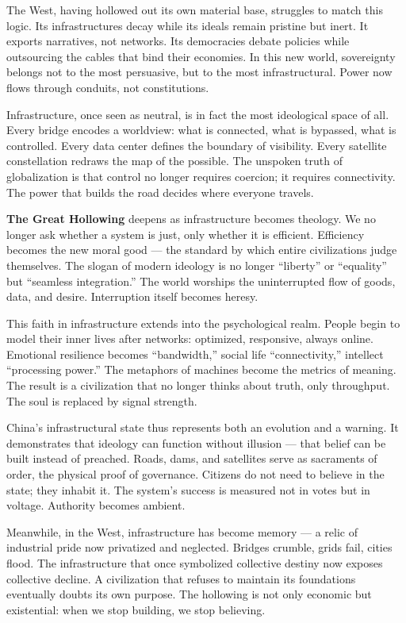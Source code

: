 \documentclass[11pt,twoside]{book}
\begin{document}
The West, having hollowed out its own material base, struggles to match this logic.  Its infrastructures decay while its ideals remain pristine but inert.  It exports narratives, not networks.  Its democracies debate policies while outsourcing the cables that bind their economies.  In this new world, sovereignty belongs not to the most persuasive, but to the most infrastructural.  Power now flows through conduits, not constitutions.

Infrastructure, once seen as neutral, is in fact the most ideological space of all.  Every bridge encodes a worldview: what is connected, what is bypassed, what is controlled.  Every data center defines the boundary of visibility.  Every satellite constellation redraws the map of the possible.  The unspoken truth of globalization is that control no longer requires coercion; it requires connectivity.  The power that builds the road decides where everyone travels.

\textbf{The Great Hollowing} deepens as infrastructure becomes theology.  We no longer ask whether a system is just, only whether it is efficient.  Efficiency becomes the new moral good — the standard by which entire civilizations judge themselves.  The slogan of modern ideology is no longer “liberty” or “equality” but “seamless integration.”  The world worships the uninterrupted flow of goods, data, and desire.  Interruption itself becomes heresy.

This faith in infrastructure extends into the psychological realm.  People begin to model their inner lives after networks: optimized, responsive, always online.  Emotional resilience becomes “bandwidth,” social life “connectivity,” intellect “processing power.”  The metaphors of machines become the metrics of meaning.  The result is a civilization that no longer thinks about truth, only throughput.  The soul is replaced by signal strength.

China’s infrastructural state thus represents both an evolution and a warning.  It demonstrates that ideology can function without illusion — that belief can be built instead of preached.  Roads, dams, and satellites serve as sacraments of order, the physical proof of governance.  Citizens do not need to believe in the state; they inhabit it.  The system’s success is measured not in votes but in voltage.  Authority becomes ambient.

Meanwhile, in the West, infrastructure has become memory — a relic of industrial pride now privatized and neglected.  Bridges crumble, grids fail, cities flood.  The infrastructure that once symbolized collective destiny now exposes collective decline.  A civilization that refuses to maintain its foundations eventually doubts its own purpose.  The hollowing is not only economic but existential: when we stop building, we stop believing.
\end{document}

